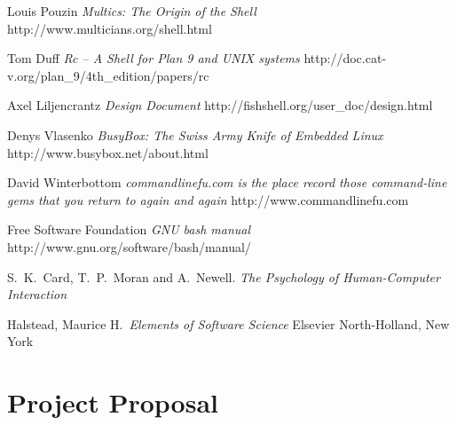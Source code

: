 \documentclass[12pt,twoside,notitlepage]{report}
\begin{document}

\cleardoublepage


\begin{thebibliography}{8} %

  Louis Pouzin
  \emph{Multics: The Origin of the Shell}
  http://www.multicians.org/shell.html

  Tom Duff
  \emph{Rc -- A Shell for Plan 9 and UNIX systems}
  http://doc.cat-v.org/plan\_9/4th\_edition/papers/rc

  Axel Liljencrantz
  \emph{Design Document}
  http://fishshell.org/user\_doc/design.html

  Denys Vlasenko
  \emph{BusyBox: The Swiss Army Knife of Embedded Linux}
  http://www.busybox.net/about.html

  David Winterbottom
  \emph{commandlinefu.com is the place record those command-line gems that
  you return to again and again}
  http://www.commandlinefu.com

  Free Software Foundation
  \emph{GNU bash manual}
  http://www.gnu.org/software/bash/manual/

  S.\ K.\ Card, T.\ P.\ Moran and A.\ Newell. 
  \emph{The Psychology of Human-Computer Interaction}

  Halstead, Maurice H.\ 
  \emph{Elements of Software Science}
  Elsevier North-Holland, New York

\end{thebibliography}
\cleardoublepage

\appendix

\chapter{Project Proposal}

\parindent 0pt
\parskip 6pt
%
\end{document}

